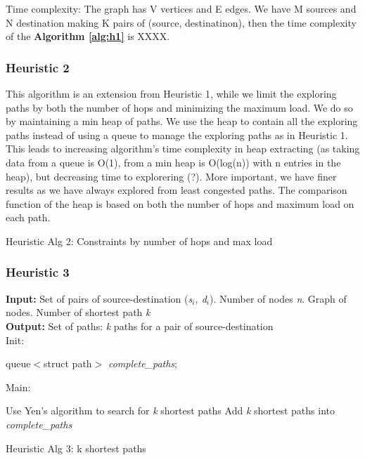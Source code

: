 Time complexity: The graph has V vertices and E edges. We have M sources and N destination making K pairs of (source, destinatinon), then the time complexity of the \textbf{Algorithm \ref{alg:h1}} is XXXX.

\subsubsection{Heuristic 2}
This algorithm is an extension from Heuristic 1, while we limit the exploring paths by both the number of hops and minimizing the maximum load. We do so by maintaining a min heap of paths. We use the heap to contain all the exploring paths instead of using a queue to manage the exploring paths as in Heuristic 1. This leads to increasing algorithm's time complexity in heap extracting (as taking data from a queue is O(1), from a min heap is O(log(n)) with n entries in the heap), but decreasing time to explorering (?). More important, we have finer results as we have always explored from least congested paths. The comparison function of the heap is based on both the number of hops and maximum load on each path. 

\begin{algorithm}

\caption{Heuristic Alg 2: Constraints by number of hops and max load}
\label{alg:h2}
\end{algorithm}

\subsubsection{Heuristic 3}

\begin{algorithm}
\textbf{Input:} Set of pairs of source-destination (\textit{s$_i$, d$_i$}). Number of nodes \textit{n}. Graph of nodes. Number of shortest path \textit{k}\\
\textbf{Output:} Set of paths: \textit{k} paths for a pair of source-destination\\
Init:
    \begin{algorithmic}
        \State queue$<$struct path$>$ \textit{complete\_paths};
    \end{algorithmic}
Main:
\begin{algorithmic}
	    \State Use Yen's algorithm to search for \textit{k} shortest paths
	    \State Add \textit{k} shortest paths into \textit{complete\_paths}
	\EndFor
    \EndFunction
\end{algorithmic}

\caption{Heuristic Alg 3: k shortest paths}
\label{alg:h3}

\end{algorithm}

